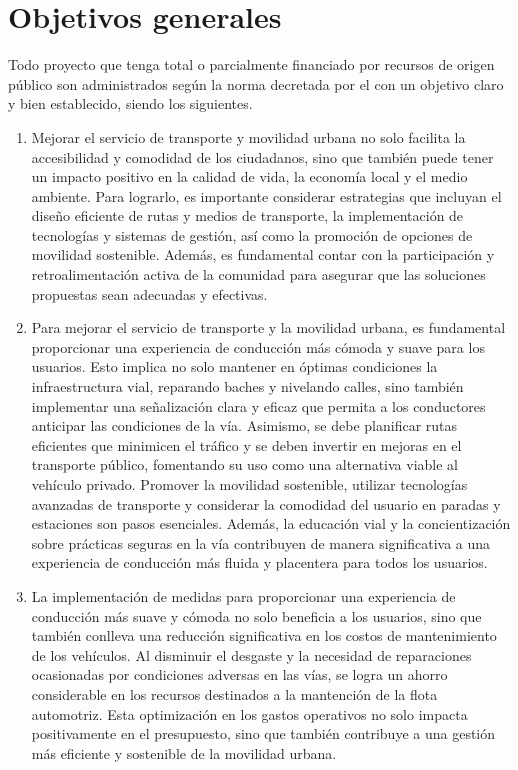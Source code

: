\section{Objetivos generales}
Todo proyecto que tenga total o parcialmente financiado por recursos de origen público son administrados según la norma decretada por el \cite{CongresoRepublica2022} con un objetivo claro y bien establecido, siendo los siguientes.

\begin{enumerate}
	\item Mejorar el servicio de transporte y movilidad urbana no solo facilita la accesibilidad y comodidad de los ciudadanos, sino que también puede tener un impacto positivo en la calidad de vida, la economía local y el medio ambiente. Para lograrlo, es importante considerar estrategias que incluyan el diseño eficiente de rutas y medios de transporte, la implementación de tecnologías y sistemas de gestión, así como la promoción de opciones de movilidad sostenible. Además, es fundamental contar con la participación y retroalimentación activa de la comunidad para asegurar que las soluciones propuestas sean adecuadas y efectivas.
	\item Para mejorar el servicio de transporte y la movilidad urbana, es fundamental proporcionar una experiencia de conducción más cómoda y suave para los usuarios. Esto implica no solo mantener en óptimas condiciones la infraestructura vial, reparando baches y nivelando calles, sino también implementar una señalización clara y eficaz que permita a los conductores anticipar las condiciones de la vía. Asimismo, se debe planificar rutas eficientes que minimicen el tráfico y se deben invertir en mejoras en el transporte público, fomentando su uso como una alternativa viable al vehículo privado. Promover la movilidad sostenible, utilizar tecnologías avanzadas de transporte y considerar la comodidad del usuario en paradas y estaciones son pasos esenciales. Además, la educación vial y la concientización sobre prácticas seguras en la vía contribuyen de manera significativa a una experiencia de conducción más fluida y placentera para todos los usuarios.
	\item La implementación de medidas para proporcionar una experiencia de conducción más suave y cómoda no solo beneficia a los usuarios, sino que también conlleva una reducción significativa en los costos de mantenimiento de los vehículos. Al disminuir el desgaste y la necesidad de reparaciones ocasionadas por condiciones adversas en las vías, se logra un ahorro considerable en los recursos destinados a la mantención de la flota automotriz. Esta optimización en los gastos operativos no solo impacta positivamente en el presupuesto, sino que también contribuye a una gestión más eficiente y sostenible de la movilidad urbana.

\end{enumerate}
